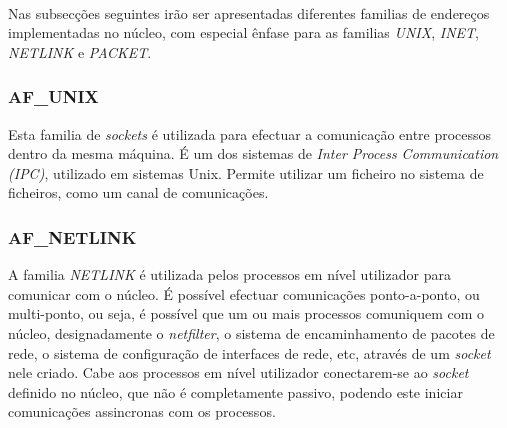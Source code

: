 \paragraph*{}
Nas subsecções seguintes irão ser apresentadas diferentes familias de endereços implementadas no núcleo, com especial ênfase para as familias \textit{UNIX}, \textit{INET}, \textit{NETLINK} e \textit{PACKET}.





\subsubsection{AF\_UNIX}

Esta familia de \textit{sockets} é utilizada para efectuar a comunicação entre processos dentro da mesma máquina.
É um dos sistemas de \textit{Inter Process Communication (IPC)}, utilizado em sistemas Unix.
\color{red}Permite utilizar um ficheiro no sistema de ficheiros, como um canal de comunicações.\color{black}

\subsubsection{AF\_NETLINK}

A familia \textit{NETLINK} é utilizada pelos processos em nível utilizador para comunicar com o núcleo.
É possível efectuar comunicações ponto-a-ponto, ou multi-ponto, ou seja, é possível que um ou mais processos comuniquem com o núcleo, designadamente o \textit{netfilter}, o sistema de encaminhamento de pacotes de rede, o sistema de configuração de interfaces de rede, etc, através de um \textit{socket} nele criado.
Cabe aos processos em nível utilizador conectarem-se ao \textit{socket} definido no núcleo, que não é completamente passivo, podendo este iniciar comunicações assincronas com os processos.

